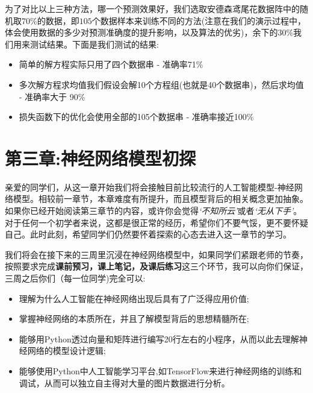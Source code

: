 \documentclass[12pt]{article}
\numberwithin{figure}{section}
\numberwithin{equation}{section}
\begin{document}
为了对比以上三种方法，哪一个预测效果好，我们选取安德森鸢尾花数据阵中的随机取70\%的数据，即$105$个数据样本来训练不同的方法(注意在我们的演示过程中，体会使用数据的多少对预测准确度的提升影响，以及算法的优劣)，余下的30\%我们用来测试结果。下面是我们测试的结果:
\begin{itemize}
	\item 简单的解方程实际只用了四个数据串 - 准确率71\%
	\item 多次解方程求均值我们假设会解10个方程组(也就是40个数据串)，然后求均值 - 准确率大于 90\%
	\item 损失函数下的优化会使用全部的105个数据串 - 准确率接近100\%
\end{itemize}
























\newpage
\part*{第三章:神经网络模型初探}


亲爱的同学们，从这一章开始我们将会接触目前比较流行的人工智能模型-神经网络模型。相较前一章节，本章难度有所提升，而且模型背后的相关概念更加抽象。如果你已经开始阅读第三章节的内容，或许你会觉得\textit{`不知所云'}或者\textit{`无从下手'}。 对于任何一个初学者来说，这都是很正常的经历，希望你们不要气馁，更不要怀疑自己。此时此刻，希望同学们仍然要怀着探索的心态去进入这一章节的学习。

我们将会在接下来的三周里沉浸在神经网络模型中，如果同学们紧跟老师的节奏，按照要求完成\textbf{课前预习，课上笔记，及课后练习}这三个环节，我可以向你们保证，三周之后你们（每一位同学)完全可以:
\begin{itemize}
	\item 理解为什么人工智能在神经网络出现后具有了广泛得应用价值;
	\item 掌握神经网络的本质所在，并且了解模型背后的思想精髓所在;
	\item 能够用Python透过向量和矩阵进行编写20行左右的小程序，从而以此去理解神经网络的模型设计逻辑;
	\item 能够使用Python中人工智能学习平台,如TensorFlow来进行神经网络的训练和调试，从而可以独立自主得对大量的图片数据进行分析。
\end{itemize}
\end{document}
